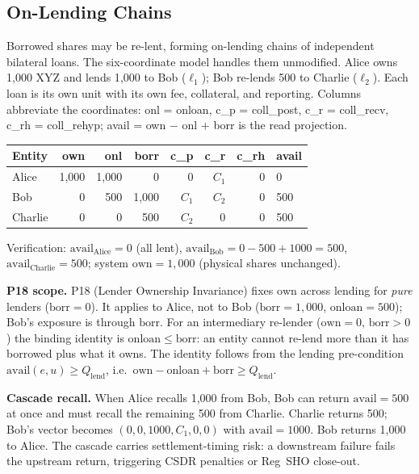 \subsection{On-Lending Chains}
\label{sec:sbl-onlending}

Borrowed shares may be re-lent, forming on-lending chains of independent bilateral loans. The six-coordinate model handles them unmodified. Alice owns 1{,}000 XYZ and lends 1{,}000 to Bob ($\ell_1$); Bob re-lends 500 to Charlie ($\ell_2$). Each loan is its own unit with its own fee, collateral, and reporting. Columns abbreviate the coordinates: onl = onloan, c\_p = coll\_post, c\_r = coll\_recv, c\_rh = coll\_rehyp; avail = own $-$ onl $+$ borr is the read projection.

\begin{center}\small
\begin{tabular}{l r r r r r r l}
\toprule
\textbf{Entity} & own & onl & borr & c\_p & c\_r & c\_rh & avail \\
\midrule
Alice   & 1{,}000 & 1{,}000 & 0      & 0     & $C_1$ & 0 & 0 \\
Bob     & 0       & 500     & 1{,}000 & $C_1$ & $C_2$ & 0 & 500 \\
Charlie & 0       & 0       & 500     & $C_2$ & 0     & 0 & 500 \\
\bottomrule
\end{tabular}
\end{center}

Verification: $\mathrm{avail}_{\text{Alice}} = 0$ (all lent), $\mathrm{avail}_{\text{Bob}} = 0-500+1000 = 500$, $\mathrm{avail}_{\text{Charlie}} = 500$; system $\mathrm{own} = 1{,}000$ (physical shares unchanged).

\noindent\textbf{P18 scope.} P18 (Lender Ownership Invariance) fixes $\mathrm{own}$ across lending for \emph{pure} lenders ($\mathrm{borr}=0$). It applies to Alice, not to Bob ($\mathrm{borr}=1{,}000$, $\mathrm{onloan}=500$); Bob's exposure is through $\mathrm{borr}$. For an intermediary re-lender ($\mathrm{own}=0$, $\mathrm{borr}>0$) the binding identity is $\mathrm{onloan}\leq\mathrm{borr}$: an entity cannot re-lend more than it has borrowed plus what it owns. The identity follows from the lending pre-condition $\mathrm{avail}(e,u)\geq Q_{\mathrm{lend}}$, i.e.\ $\mathrm{own}-\mathrm{onloan}+\mathrm{borr}\geq Q_{\mathrm{lend}}$.

\noindent\textbf{Cascade recall.} When Alice recalls 1{,}000 from Bob, Bob can return $\mathrm{avail}=500$ at once and must recall the remaining 500 from Charlie. Charlie returns 500; Bob's vector becomes $(0,0,1000,C_1,0,0)$ with $\mathrm{avail}=1000$. Bob returns 1{,}000 to Alice. The cascade carries settlement-timing risk: a downstream failure fails the upstream return, triggering CSDR penalties or Reg~SHO close-out.

